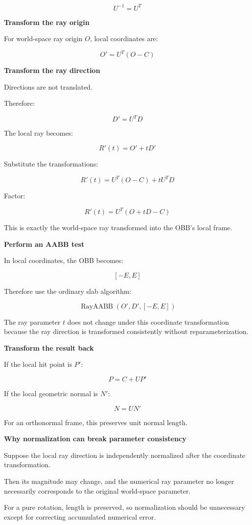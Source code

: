 \[
U^{-1}=U^T
\]

\textbf{Transform the ray origin}

For world-space ray origin \(O\), local coordinates are:

\[
\boxed{ O'=U^T(O-C) }
\]

\textbf{Transform the ray direction}

Directions are not translated.

Therefore:

\[
\boxed{ D'=U^TD }
\]

The local ray becomes:

\[
R'(t)=O'+tD'
\]

Substitute the transformations:

\[
R'(t)=U^T(O-C)+tU^TD
\]

Factor:

\[
R'(t)=U^T(O+tD-C)
\]

This is exactly the world-space ray transformed into the OBB's local frame.

\textbf{Perform an AABB test}

In local coordinates, the OBB becomes:

\[
[-E,E]
\]

Therefore use the ordinary slab algorithm:

\[
\operatorname{RayAABB}(O',D',[-E,E])
\]

The ray parameter \(t\) does not change under this coordinate transformation because the ray direction is transformed consistently without reparameterization.

\textbf{Transform the result back}

If the local hit point is \(P'\):

\[
\boxed{ P=C+UP' }
\]

If the local geometric normal is \(N'\):

\[
\boxed{ N=UN' }
\]

For an orthonormal frame, this preserves unit normal length.

\textbf{Why normalization can break parameter consistency}

Suppose the local ray direction is independently normalized after the coordinate transformation.

Then its magnitude may change, and the numerical ray parameter no longer necessarily corresponds to the original world-space parameter.

For a pure rotation, length is preserved, so normalization should be unnecessary except for correcting accumulated numerical error.

